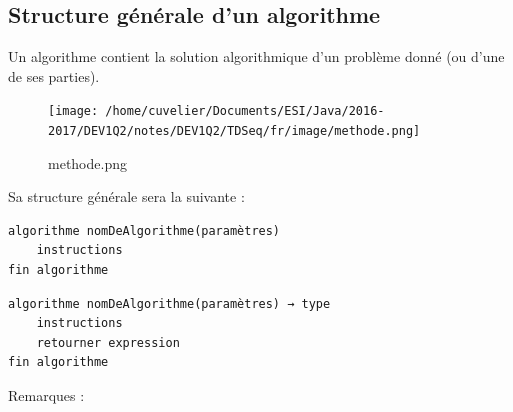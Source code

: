 \documentclass[11pt,a4paper]{article}
\begin{document}
        \subsection{Structure g\'en\'erale d'un algorithme}
          Un algorithme contient la solution algorithmique d'un probl\`eme donn\'e (ou d'une de ses parties).
        
            \par
        \begin{figure}[hbt]
				    \begin{center}
					\texttt{[image: /home/cuvelier/Documents/ESI/Java/2016-2017/DEV1Q2/notes/DEV1Q2/TDSeq/fr/image/methode.png]}
						\end{center}
                
                    \caption[methode.png]{methode.png}
                \end{figure}
                    
            \par
        
          Sa structure g\'en\'erale sera la suivante :
        
            \par
        \begin{verbatim}
algorithme nomDeAlgorithme(paramètres)
    instructions
fin algorithme
				\end{verbatim}\begin{verbatim}
algorithme nomDeAlgorithme(paramètres) → type
    instructions
    retourner expression
fin algorithme
				\end{verbatim}
          Remarques :
          
\end{document}
